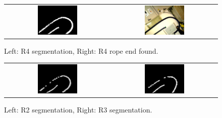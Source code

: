         \begin{figure}
            \centering
            \begin{tabular}{cc}
            \includegraphics[width=0.39\textwidth]{R4SegmentationAdj.png}
            &
            \includegraphics[width=0.39\textwidth]{R4RopeEndFoundAdj.png}

            \end{tabular}
            \caption{Left: R4 segmentation, Right: R4 rope end found.}
            \label{fig:R4success}
        \end{figure}

        \begin{figure}
            \centering
            \begin{tabular}{cc}
            \includegraphics[width=0.39\textwidth]{R2SegmentationAdj.png}
            &
            \includegraphics[width=0.39\textwidth]{R3SegmentationAdj.png}


            \end{tabular}
            \caption{Left: R2 segmentation, Right: R3 segmentation.}
            \label{fig:R2R3failure}
        \end{figure}

